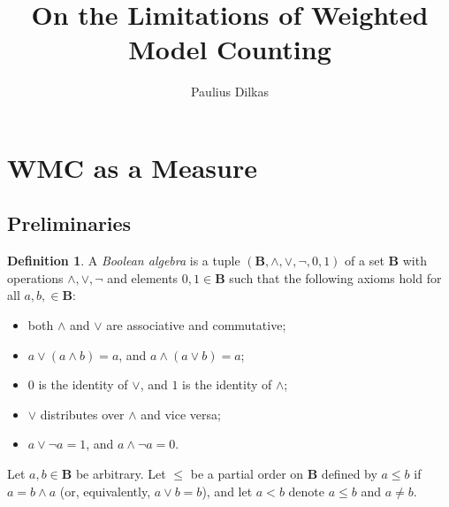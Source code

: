 \documentclass{article}
\title{On the Limitations of Weighted Model Counting}
\author{Paulius Dilkas}
\theoremstyle{definition}
\newtheorem{definition}{Definition}
\theoremstyle{remark}
\begin{document}
\maketitle




\section{WMC as a Measure}

\subsection{Preliminaries}

\begin{definition} \label{def:ba}
  A \emph{Boolean algebra} is a tuple $(\mathbf{B}, \land, \lor, \neg, 0, 1)$ of
  a set $\mathbf{B}$ with operations $\land, \lor, \neg$ and elements $0, 1 \in
  \mathbf{B}$ such that the following axioms hold for all $a, b, \in
  \mathbf{B}$:
  \begin{itemize}
  \item both $\land$ and $\lor$ are associative and commutative;
  \item $a \lor (a \land b) = a$, and $a \land (a \lor b) = a$;
  \item $0$ is the identity of $\lor$, and $1$ is the identity of $\land$;
  \item $\lor$ distributes over $\land$ and vice versa;
  \item $a \lor \neg a = 1$, and $a \land \neg a = 0$.
  \end{itemize}

  Let $a, b \in \mathbf{B}$ be arbitrary. Let $\le$ be a partial order on
  $\mathbf{B}$ defined by $a \le b$ if $a = b \land a$ (or, equivalently, $a
  \lor b = b$), and let $a < b$ denote $a \le b$ and $a \ne b$.
\end{definition}
\end{document}
